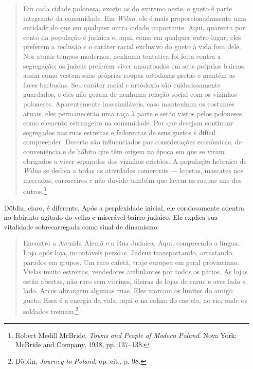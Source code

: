 \begin{quote}
Em cada cidade polonesa, exceto as do extremo oeste, o gueto é parte
integrante da comunidade. Em \textit{Wilno}, ele é mais proporcionadamente uma
entidade do que em qualquer outra cidade importante. Aqui, quarenta por
cento da população é judaica e, aqui, como em qualquer outro lugar, eles
preferem a reclusão e o caráter racial exclusivo do gueto à vida fora
dele. Nos atuais tempos modernos, nenhuma tentativa foi feita contra a
segregação; os judeus preferem viver amontoados em seus próprios
bairros, assim como vestem suas próprias roupas ortodoxas pretas e
mantêm as faces barbudas. Seu caráter racial e ortodoxia são
cuidadosamente guardados, e eles não gozam de nenhuma relação social com
os vizinhos poloneses. Aparentemente inassimiláveis, caso mantenham os
costumes atuais, eles permanecerão uma raça à parte e serão vistos pelos
poloneses como elemento estrangeiro na comunidade. Por que desejam
continuar segregados nas ruas estreitas e fedorentas de seus guetos é
difícil compreender. Decerto são influenciados por considerações
econômicas, de conveniência e de hábito que têm origem na época em que
se viram obrigados a viver separados dos vizinhos cristãos. A população
hebraica de \textit{Wilno} se dedica a todas as atividades comerciais --- lojistas,
mascates nos mercados, carroceiros e não duvido também que lavem as
roupas uns dos outros.\footnote{Robert Medill McBride, \textit{Towns and People of Modern Poland}. Nova York: McBride and Company, 1938, pp. 137--138.} 
\end{quote}

%

Döblin, claro, é diferente. Após a perplexidade inicial, ele
corajosamente adentra no labirinto agitado do velho e miserável bairro
judaico. Ele explica sua vitalidade sobrecarregada como sinal de
dinamismo:

\begin{quote}
Encontro a Avenida Alemã e a Rua Judaica. Aqui, compreendo a língua.
Loja após loja, incontáveis pessoas. Judeus transportando, arrastando,
parados em grupos. Um raro cafetã, traje europeu em geral provinciano.
Vielas muito estreitas, vendedores ambulantes por todos os pátios. As
lojas estão abertas, não raro sem vitrines, fileiras de lojas de carne e
aves lado a lado. Arcos abrangem algumas ruas. Eles marcam os limites do
antigo gueto. Essa é a energia da vida, aqui e na colina do castelo, no
rio, onde os soldados treinam.\footnote{Döblin, \textit{Journey to Poland}, op. cit., p. 98.} 
\end{quote}

